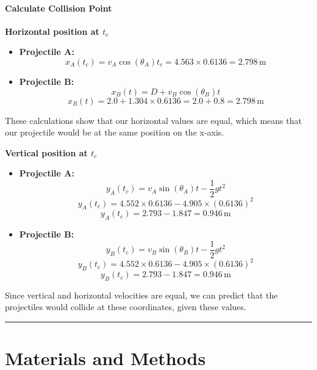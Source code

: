 \documentclass[12pt]{article}
\begin{document}
\paragraph{\large \textbf{Calculate Collision Point}}

\textbf{Horizontal position at \( t_c \)}
\begin{itemize}
    \item \textbf{Projectile A:}
    \[
    x_A(t_c) = v_A \cos(\theta_A) t_c = 4.563 \times 0.6136 = 2.798 \, \text{m}
    \]
    
    \item \textbf{Projectile B:}
    \[
    x_B(t) = D + v_B \cos(\theta_B) t
    \]
    \[
    x_B(t) = 2.0 + 1.304 \times 0.6136 = 2.0 + 0.8 = 2.798 \, \text{m}
    \]
\end{itemize}

These calculations show that our horizontal values are equal, which means that our projectile would be at the same position on the x-axis.

\textbf{Vertical position at \( t_c \)}
\begin{itemize}
    \item \textbf{Projectile A:}
    \[
    y_A(t_c) = v_A \sin(\theta_A) t - \frac{1}{2} g t^2
    \]
    \[
    y_A(t_c) = 4.552 \times 0.6136 - 4.905 \times (0.6136)^2
    \]
    \[
    y_A(t_c) = 2.793 - 1.847 = 0.946 \, \text{m}
    \]

    \item \textbf{Projectile B:}
    \[
    y_B(t_c) = v_B \sin(\theta_B) t - \frac{1}{2} g t^2
    \]
    \[
    y_B(t_c) = 4.552 \times 0.6136 - 4.905 \times (0.6136)^2
    \]
    \[
    y_B(t_c) = 2.793 - 1.847 = 0.946 \, \text{m}
    \]
\end{itemize}

Since vertical and horizontal velocities are equal, we can predict that the projectiles would collide at these coordinates, given these values.

\noindent\rule{\textwidth}{0.5pt} %



\section{Materials and Methods}
\end{document}
